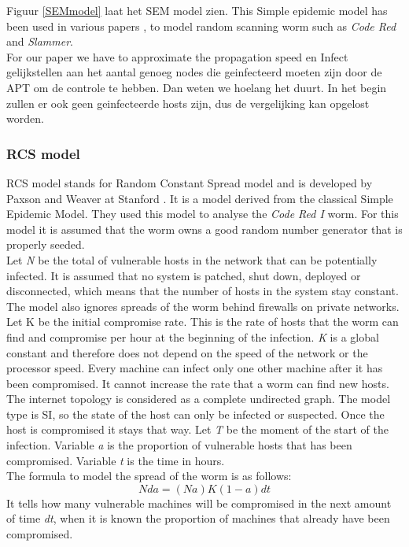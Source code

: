 Figuur \ref{SEMmodel} laat het SEM model zien.
This Simple epidemic model has been used in various papers \cite{OwnInternetSI}, \cite{CodeRed} to model random scanning worm such as \textit{Code Red} and \textit{Slammer}. \\
For our paper we have to approximate the propagation speed en Infect gelijkstellen aan het aantal genoeg nodes die geinfecteerd moeten zijn door de APT om de controle te hebben. Dan weten we hoelang het duurt. In het begin zullen er ook geen geinfecteerde hosts zijn, dus de vergelijking kan opgelost worden.\\

\subsubsection{RCS model}

RCS model stands for Random Constant Spread model and is developed by Paxson and Weaver at Stanford \citep{OwnInternetSI}. It is a model derived from the classical Simple Epidemic Model. They used this model to analyse the \textit{Code Red I} worm. For this model it is assumed that the worm owns a good random number generator that is properly seeded. \\
Let\textit{ N} be the total of vulnerable hosts in the network that can be potentially infected. It is assumed that no system is patched, shut down, deployed or disconnected, which means that the number of hosts in the system stay constant. The model also ignores spreads of the worm behind firewalls on private networks. \\
Let K be the initial compromise rate. This is the rate of hosts that the worm can find and compromise per hour at the beginning of the infection. \textit{K} is a global constant and therefore does not depend on the speed of the network or the processor speed.  Every machine can infect only one other machine after it has been compromised. It cannot increase the rate that a worm can find new hosts. 
The internet topology is considered as a complete undirected graph.  The model type is SI, so the state of the host can only be infected or suspected. Once the host is compromised it stays that way.  
Let \textit{T} be the moment of the start of the infection. Variable \textit{a} is the proportion of vulnerable hosts that has been compromised. Variable \textit{t} is the time in hours. \\

The formula to model the spread of the worm is as follows:
\begin{equation}
N da = (N a)K(1 - a)dt
\end{equation}
It tells how many vulnerable machines will be compromised in the next amount of time \textit{dt}, when it is known the proportion of machines  that already have been compromised.\\

